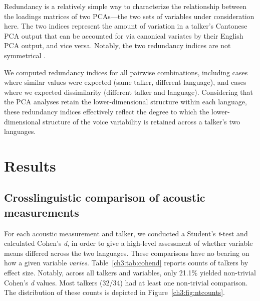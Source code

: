 Redundancy is a relatively simple way to characterize the relationship between the loadings matrices of two PCAs---the two sets of variables under consideration here. The two indices represent the amount of variation in a talker's Cantonese PCA output that can be accounted for via canonical variates by their English PCA output, and vice versa. Notably, the two redundancy indices are not symmetrical \citep{stewart_1968_canonical}.

We computed redundancy indices for all pairwise combinations, including cases where similar values were expected (same talker, different language), and cases where we expected dissimilarity (different talker and language). Considering that the PCA analyses retain the lower-dimensional structure within each language, these redundancy indices effectively reflect the degree to which the lower-dimensional structure of the voice variability is retained across a talker's two languages.

\section{Results}\label{ch3:sec:results}

\subsection{Crosslinguistic comparison of acoustic measurements}

For each acoustic measurement and talker, we conducted a Student's \textit{t}-test and calculated Cohen's \textit{d}, in order to give a high-level assessment of whether variable means differed across the two languages. These comparisons have no bearing on how a given variable \textit{varies}. Table~\ref{ch3:tab:cohend} reports counts of talkers by effect size. Notably, across all talkers and variables, only 21.1\% yielded non-trivial Cohen's \textit{d} values. Most talkers (32/34) had at least one non-trivial comparison. The distribution of these counts is depicted in Figure~\ref{ch3:fig:ntcounts}. 

